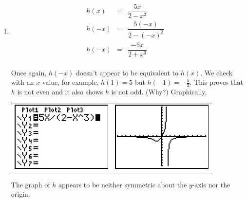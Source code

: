 \begin{ex}
\begin{enumerate}
\setlength{\extrarowheight}{8pt}

\item  \[ \begin{array}{rclr}   

h(x) & = & \dfrac{5x}{2 - x^3} & \\ 
h(-x) & = & \dfrac{5(-x)}{2 - (-x)^3} & \\  
h(-x) & = & \dfrac{-5x}{2 + x^3} & \\  

\end{array} \]

\setlength{\extrarowheight}{2pt}

Once again, $h(-x)$ doesn't appear to be equivalent to $h(x)$.  We check with an $x$ value, for example, $h(1) = 5$ but $h(-1) = -\frac{5}{3}$.  This proves that $h$ is not even and it also shows $h$ is not odd. (Why?)  Graphically,

\begin{center}

\begin{tabular}{cc}

\includegraphics[width=2in]{./RelationsandFunctionsGraphics/GraphsofFunctions05.jpg} \hspace{.75in} & \includegraphics[width=2in]{./RelationsandFunctionsGraphics/GraphsofFunctions06.jpg} \\

\end{tabular}

\end{center}

The graph of $h$ appears to be neither symmetric about the $y$-axis nor the origin.

\setlength{\extrarowheight}{8pt}


\end{enumerate}
\end{ex}

